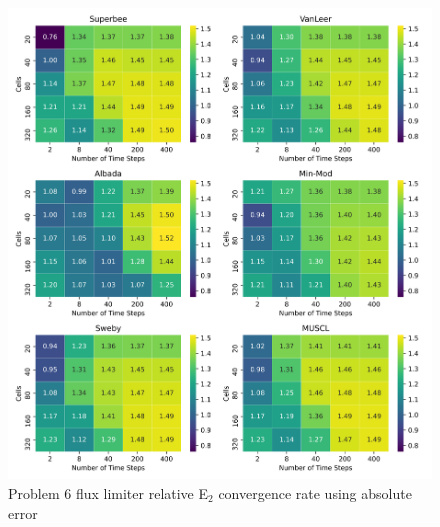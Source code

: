 \clearpage

\begin{figure}[p]
    \centering
    \includegraphics[width=6in]{images/chapter-5/progressionProblems/problem6/problem6E2FluxLimiterConvergenceRate.png}
    \caption{Problem 6 flux limiter relative E${}_{2}$ convergence rate using absolute error}
    \label{fig:problem6_l2error_fluxlimiter_convergence_rate}
\end{figure}